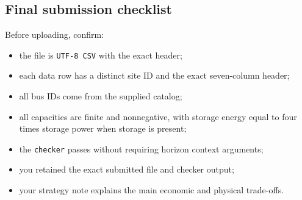 \documentclass[12pt]{article}
\newcommand{\code}[1]{\texttt{#1}}
\begin{document}
\subsection{Final submission checklist}
Before uploading, confirm:
\begin{itemize}[leftmargin=*]
  \item the file is \code{UTF-8 CSV} with the exact header;
  \item each data row has a distinct site ID and the exact seven-column header;
  \item all bus IDs come from the supplied catalog;
  \item all capacities are finite and nonnegative, with storage energy equal to
    four times storage power when storage is present;
  \item the \code{checker} passes without requiring horizon context arguments;
  \item you retained the exact submitted file and checker output;
  \item your strategy note explains the main economic and physical trade-offs.
\end{itemize}
\end{document}
